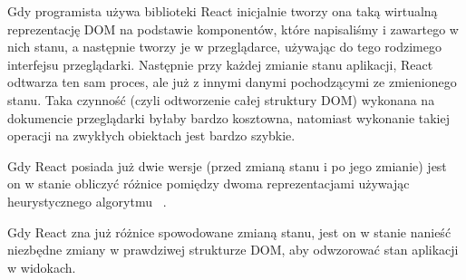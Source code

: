 \begin{description}
  Gdy programista używa biblioteki React inicjalnie tworzy ona taką wirtualną reprezentację DOM na podstawie komponentów, które napisaliśmy i zawartego w nich stanu, a następnie tworzy je w przeglądarce, używając do tego rodzimego interfejsu przeglądarki. Następnie przy każdej zmianie stanu aplikacji, React odtwarza ten sam proces, ale już z innymi danymi pochodzącymi ze zmienionego stanu. Taka czynność (czyli odtworzenie całej struktury DOM) wykonana na dokumencie przeglądarki byłaby bardzo kosztowna, natomiast wykonanie takiej operacji na zwykłych obiektach jest bardzo szybkie.

  Gdy React posiada już dwie wersje (przed zmianą stanu i po jego zmianie) jest on w stanie obliczyć różnice pomiędzy dwoma reprezentacjami używając heurystycznego algorytmu ~\cite{ref_heuristic_alg}.

  Gdy React zna już różnice spowodowane zmianą stanu, jest on w stanie nanieść niezbędne zmiany w prawdziwej strukturze DOM, aby odwzorować stan aplikacji w widokach.
\end{description}

